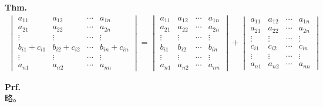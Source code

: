 \documentclass[a4paper,11pt]{jsarticle}
\numberwithin{equation}{section}
\begin{document}
\begin{itembox}[l]{\textbf{Thm.}}
  \begin{align}
    \begin{vmatrix}
      a_{11} & a_{12} & \cdots & a_{1n}\\
      a_{21} & a_{22} & \cdots & a_{2n}\\
      \vdots & \vdots & \cdots & \vdots\\
      b_{i1}+c_{i1} & b_{i2}+c_{i2} & \cdots & b_{in}+c_{in}\\
      \vdots & \vdots & \cdots & \vdots\\
      a_{n1} & a_{n2} & \cdots & a_{nn}
    \end{vmatrix}
    =
    \begin{vmatrix}
      a_{11} & a_{12} & \cdots & a_{1n}\\
      a_{21} & a_{22} & \cdots & a_{2n}\\
      \vdots & \vdots & \cdots & \vdots\\
      b_{i1} & b_{i2} & \cdots & b_{in}\\
      \vdots & \vdots & \cdots & \vdots\\
      a_{n1} & a_{n2} & \cdots & a_{nn}
    \end{vmatrix}
    +
    \begin{vmatrix}
      a_{11} & a_{12} & \cdots & a_{1n}\\
      a_{21} & a_{22} & \cdots & a_{2n}\\
      \vdots & \vdots & \cdots & \vdots\\
      c_{i1} & c_{i2} & \cdots & c_{in}\\
      \vdots & \vdots & \cdots & \vdots\\
      a_{n1} & a_{n2} & \cdots & a_{nn}
    \end{vmatrix}
  \end{align}
\end{itembox}
\textbf{Prf.}\\
略。\hfill\qedsymbol\\
\end{document}
